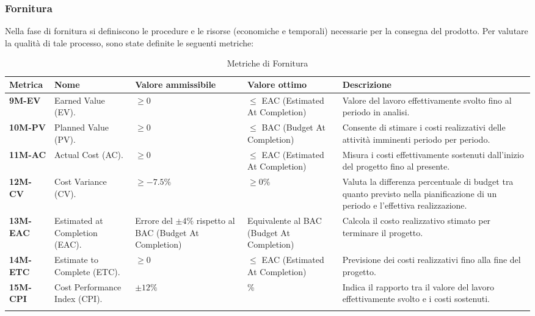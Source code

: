 \subsubsection{Fornitura}
Nella fase di fornitura si definiscono le procedure e le risorse (economiche e temporali) necessarie per la consegna del prodotto.
Per valutare la qualità di tale processo, sono state definite le seguenti metriche:
\begin{longtable}{|>{\raggedright\arraybackslash}m{}|>{\raggedright\arraybackslash}m{}|>{\raggedright\arraybackslash}m{}|>{\raggedright\arraybackslash}m{}|>{\raggedright\arraybackslash}m{}|}
	\hline
	\textbf{Metrica} & \textbf{Nome} & \textbf{Valore ammissibile} & \textbf{Valore ottimo} & \textbf{Descrizione}\\
	\hline
	\endhead
	\textbf{9M-EV} & Earned Value (EV). & $\geq 0$ & $\leq$ EAC (Estimated At Completion) & Valore del lavoro effettivamente svolto fino al periodo in analisi. \\
	\hline
	\textbf{10M-PV} & Planned Value (PV). & $\geq 0$ & $\leq$ BAC (Budget At Completion) & Consente di stimare i costi realizzativi delle attività imminenti periodo per periodo. \\
	\hline
	\textbf{11M-AC} & Actual Cost (AC). & $\geq 0$ & $\leq$ EAC (Estimated At Completion) & Misura i costi effettivamente sostenuti dall'inizio del progetto fino al presente. \\
	\hline
	\textbf{12M-CV} & Cost Variance (CV). & $\geq -7.5\%$ & $\geq 0\%$ & Valuta la differenza percentuale di budget tra quanto previsto nella pianificazione di un periodo e l'effettiva realizzazione. \\
	\hline
	\textbf{13M-EAC} & Estimated at Completion (EAC). & Errore del $\pm 4\%$ rispetto al BAC (Budget At Completion) & Equivalente al BAC (Budget At Completion) & Calcola il costo realizzativo stimato per terminare il progetto.\\
	\hline
	\textbf{14M-ETC} & Estimate to Complete (ETC). & $\geq 0$ & $\leq$ EAC (Estimated At Completion) & Previsione dei costi realizzativi fino alla fine del progetto.\\
	\hline
	\textbf{15M-CPI} & Cost Performance Index (CPI). & $\pm 12\%$ & 0\% & Indica il rapporto tra il valore del lavoro effettivamente svolto e i costi sostenuti.\\
	\hline
	\caption{Metriche di Fornitura}
	\label{table:4}
\end{longtable}

